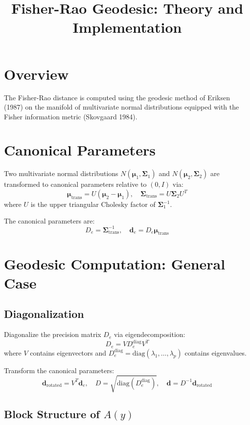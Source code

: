 \documentclass{article}
\title{Fisher-Rao Geodesic: Theory and Implementation}
\author{}
\date{}
\begin{document}
\maketitle

\section{Overview}

The Fisher-Rao distance is computed using the geodesic method of Eriksen (1987) on the manifold of multivariate normal distributions equipped with the Fisher information metric (Skovgaard 1984).

\section{Canonical Parameters}

Two multivariate normal distributions $N(\boldsymbol{\mu}_1, \boldsymbol{\Sigma}_1)$ and $N(\boldsymbol{\mu}_2, \boldsymbol{\Sigma}_2)$ are transformed to canonical parameters relative to $(0, I)$ via:
\[
\boldsymbol{\mu}_{\text{trans}} = U(\boldsymbol{\mu}_2 - \boldsymbol{\mu}_1), \quad 
\boldsymbol{\Sigma}_{\text{trans}} = U\boldsymbol{\Sigma}_2 U^T
\]
where $U$ is the upper triangular Cholesky factor of $\boldsymbol{\Sigma}_1^{-1}$.

The canonical parameters are:
\[
D_e = \boldsymbol{\Sigma}_{\text{trans}}^{-1}, \quad 
\mathbf{d}_e = D_e \boldsymbol{\mu}_{\text{trans}}
\]

\section{Geodesic Computation: General Case}

\subsection{Diagonalization}

Diagonalize the precision matrix $D_e$ via eigendecomposition:
\[
D_e = V D_e^{\text{diag}} V^T
\]
where $V$ contains eigenvectors and $D_e^{\text{diag}} = \text{diag}(\lambda_1, \ldots, \lambda_p)$ contains eigenvalues.

Transform the canonical parameters:
\[
\mathbf{d}_{\text{rotated}} = V^T \mathbf{d}_e, \quad 
D = \sqrt{\text{diag}(D_e^{\text{diag}})}, \quad 
\mathbf{d} = D^{-1} \mathbf{d}_{\text{rotated}}
\]

\subsection{Block Structure of $A(y)$}
\end{document}
